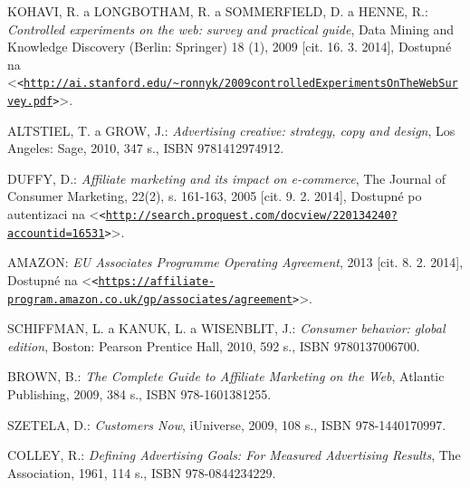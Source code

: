 \documentclass[12pt,twoside,openany]{fithesis}
\let\origurl\url
\def\url#1{\texttt{<\origurl{#1}>}}
\begin{document}

\begin{thebibliography}{99}


KOHAVI, R. a LONGBOTHAM, R. a SOMMERFIELD, D. a HENNE, R.: \emph{Controlled experiments on the web: survey and practical
      guide}, Data Mining and Knowledge Discovery (Berlin: Springer)
        18 (1), 2009 [cit. 16. 3. 2014], Dostupné na {\textless}\url{http://ai.stanford.edu/~ronnyk/2009controlledExperimentsOnTheWebSurvey.pdf}{\textgreater}. 

ALTSTIEL, T. a GROW, J.: \emph{Advertising creative: strategy, copy and design}, Los Angeles: Sage, 2010, 347 s., ISBN 9781412974912.


DUFFY, D.: \emph{Affiliate marketing and its impact on e-commerce}, The Journal of Consumer Marketing, 22(2),
        s. 161-163, 2005 [cit. 9. 2. 2014], Dostupné po autentizaci na {\textless}\url{http://search.proquest.com/docview/220134240?accountid=16531}{\textgreater}. 


AMAZON: \emph{EU Associates Programme Operating Agreement}, 2013 [cit. 8. 2. 2014], Dostupné na {\textless}\url{https://affiliate-program.amazon.co.uk/gp/associates/agreement}{\textgreater}. 


SCHIFFMAN, L. a KANUK, L. a WISENBLIT, J.: \emph{Consumer behavior: global edition}, Boston: Pearson Prentice Hall, 2010, 592 s., ISBN 9780137006700. 


BROWN, B.: \emph{The Complete Guide to Affiliate Marketing on the Web}, Atlantic Publishing, 2009, 384 s., ISBN 978-1601381255. 


SZETELA, D.: \emph{Customers Now}, iUniverse, 2009, 108 s., ISBN 978-1440170997. 


COLLEY, R.: \emph{Defining Advertising Goals: For Measured Advertising
      Results}, The Association, 1961, 114 s., ISBN 978-0844234229. 


\end{thebibliography}
\end{document}
